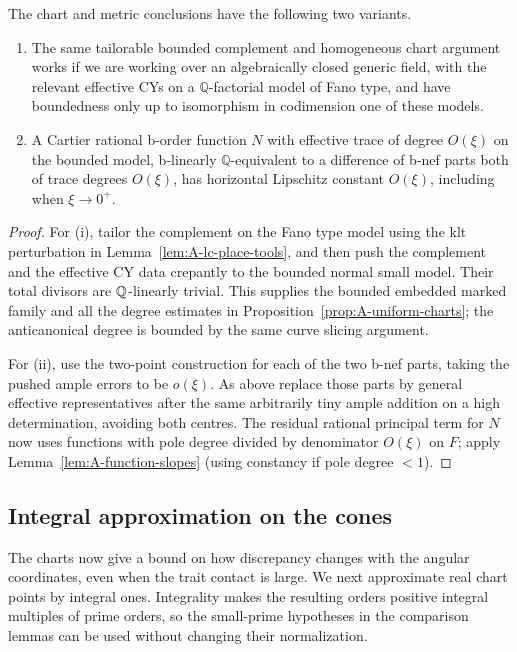 \begin{corollary}\label{cor:A-horizontal-variants}
The chart and metric conclusions have the following two variants.
\begin{enumerate}[label=\textup{(\roman*)}]
\item
The same tailorable bounded complement and homogeneous chart argument works if we are working over an algebraically closed generic field, with the relevant effective CYs on a \(\mathbb Q\)-factorial model of Fano type, and have boundedness only up to isomorphism in codimension one of these models.
\item
A Cartier rational b-order function \(N\) with effective trace of degree
\(O(\xi)\) on the bounded model, b-linearly \(\mathbb Q\)-equivalent
to a difference of b-nef parts both of trace degrees \(O(\xi)\), has
horizontal Lipschitz constant \(O(\xi)\), including when \(\xi\to0^+\).
\end{enumerate}
\end{corollary}

\begin{proof}
For \textup{(i)}, tailor the complement on the Fano type model using
the klt perturbation in Lemma~\ref{lem:A-lc-place-tools}, and then push
the complement and the effective CY data crepantly to the bounded
normal small model.  Their total divisors are \(\mathbb Q\)-linearly trivial.
This supplies the bounded embedded marked family and all the degree
estimates in Proposition~\ref{prop:A-uniform-charts}; the
anticanonical degree is bounded by the same curve slicing argument.

For \textup{(ii)}, use the two-point construction for each of the two
b-nef parts, taking the pushed ample errors to be \(o(\xi)\).
As above replace those parts by general effective representatives after the same arbitrarily tiny ample addition on a high determination, avoiding both centres.
The residual rational principal term for \(N\) now uses functions with pole degree divided by denominator \(O(\xi)\) on \(F\); apply Lemma~\ref{lem:A-function-slopes} (using constancy if pole degree \(<1\)).
\end{proof}

\subsection{Integral approximation on the cones}

The charts now give a bound on how discrepancy changes with the angular
coordinates, even when the trait contact is large.  We next approximate
real chart points by integral ones.  Integrality makes the resulting
orders positive integral multiples of prime orders, so the small-prime
hypotheses in the comparison lemmas can be used without changing their
normalization.

